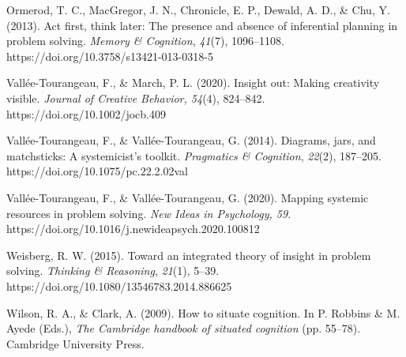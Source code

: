 \documentclass{article}
\begin{document}
Ormerod, T. C., MacGregor, J. N., Chronicle, E. P., Dewald, A. D., \& Chu, Y. (2013). Act first, think later: The presence and absence of inferential planning in problem solving. \emph{Memory \& Cognition}, \emph{41}(7), 1096--1108. https://doi.org/10.3758/s13421-013-0318-5

Vallée-Tourangeau, F., \& March, P. L. (2020). Insight out: Making creativity visible. \emph{Journal of Creative Behavior, 54}(4), 824--842. https://doi.org/10.1002/jocb.409

Vallée-Tourangeau, F., \& Vallée-Tourangeau, G. (2014). Diagrams, jars, and matchsticks: A systemicist's toolkit. \emph{Pragmatics \& Cognition}, \emph{22}(2), 187--205. https://doi.org/10.1075/pc.22.2.02val

Vallée-Tourangeau, F., \& Vallée-Tourangeau, G. (2020). Mapping systemic resources in problem solving. \emph{New Ideas in Psychology, 59}. https://doi.org/10.1016/j.newideapsych.2020.100812

Weisberg, R. W. (2015). Toward an integrated theory of insight in problem solving. \emph{Thinking \& Reasoning}, \emph{21}(1), 5--39. https://doi.org/10.1080/13546783.2014.886625

Wilson, R. A., \& Clark, A. (2009). How to situate cognition. In P. Robbins \& M. Ayede (Eds.), \emph{The Cambridge handbook of situated cognition} (pp. 55--78). Cambridge University Press.
\end{document}
